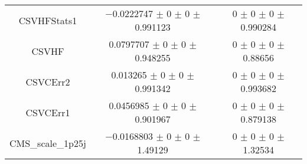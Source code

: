 \begin{table}
\begin{tabular}{ccc}
CSVHFStats1 	& \num{-0.0222747} $\pm$ \num{0} $\pm$ \num{0} $\pm$ \num{0.991123} 	& \num{0} $\pm$ \num{0} $\pm$ \num{0} $\pm$ \num{0.990284}\\
CSVHF 	& \num{0.0797707} $\pm$ \num{0} $\pm$ \num{0} $\pm$ \num{0.948255} 	& \num{0} $\pm$ \num{0} $\pm$ \num{0} $\pm$ \num{0.88656}\\
CSVCErr2 	& \num{0.013265} $\pm$ \num{0} $\pm$ \num{0} $\pm$ \num{0.991342} 	& \num{0} $\pm$ \num{0} $\pm$ \num{0} $\pm$ \num{0.993682}\\
CSVCErr1 	& \num{0.0456985} $\pm$ \num{0} $\pm$ \num{0} $\pm$ \num{0.901967} 	& \num{0} $\pm$ \num{0} $\pm$ \num{0} $\pm$ \num{0.879138}\\
CMS\_scale\_1p25j 	& \num{-0.0168803} $\pm$ \num{0} $\pm$ \num{0} $\pm$ \num{1.49129} 	& \num{0} $\pm$ \num{0} $\pm$ \num{0} $\pm$ \num{1.32534}\\
\bottomrule
\end{tabular}
\end{table}